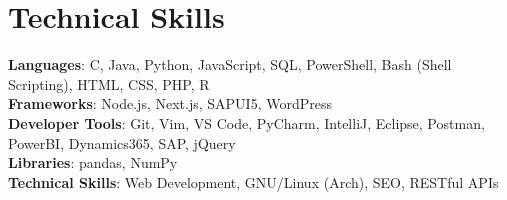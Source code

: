 \documentclass[letterpaper,11pt]{article}
\begin{document}
\section{Technical Skills}
 \begin{itemize}[leftmargin=0.15in, label={}]
    \small{\item{
     \textbf{Languages}{: C, Java, Python, JavaScript, SQL, PowerShell, Bash (Shell Scripting), HTML, CSS, PHP, R} \\
     \textbf{Frameworks}{: Node.js, Next.js, SAPUI5, WordPress} \\
     \textbf{Developer Tools}{: Git, Vim, VS Code, PyCharm, IntelliJ, Eclipse, Postman, PowerBI, Dynamics365, SAP, jQuery} \\
     \textbf{Libraries}{: pandas, NumPy} \\
     \textbf{Technical Skills}{: Web Development, GNU/Linux (Arch), SEO, RESTful APIs}
    }}
 \end{itemize}


\end{document}
